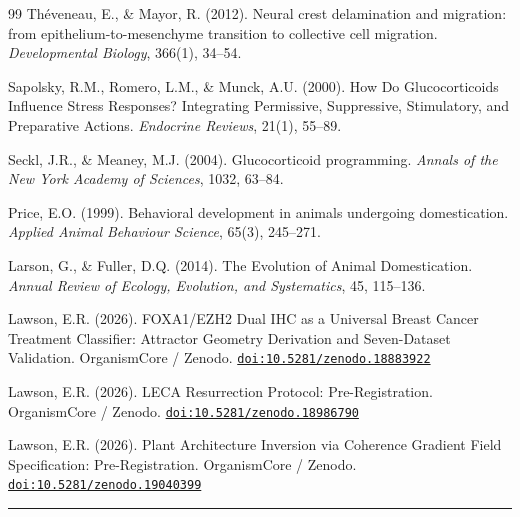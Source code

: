 \documentclass[11pt, a4paper]{article}
\begin{document}
\begin{thebibliography}{99}
Th\'{e}veneau, E., \& Mayor, R. (2012).
Neural crest delamination and migration:
from epithelium-to-mesenchyme transition to collective
cell migration.
\textit{Developmental Biology}, 366(1), 34--54.

Sapolsky, R.M., Romero, L.M., \& Munck, A.U. (2000).
How Do Glucocorticoids Influence Stress Responses?
Integrating Permissive, Suppressive, Stimulatory, and
Preparative Actions.
\textit{Endocrine Reviews}, 21(1), 55--89.

Seckl, J.R., \& Meaney, M.J. (2004).
Glucocorticoid programming.
\textit{Annals of the New York Academy of Sciences},
1032, 63--84.

Price, E.O. (1999).
Behavioral development in animals undergoing
domestication.
\textit{Applied Animal Behaviour Science},
65(3), 245--271.

Larson, G., \& Fuller, D.Q. (2014).
The Evolution of Animal Domestication.
\textit{Annual Review of Ecology, Evolution,
and Systematics}, 45, 115--136.

Lawson, E.R. (2026).
FOXA1/EZH2 Dual IHC as a Universal Breast Cancer
Treatment Classifier: Attractor Geometry Derivation
and Seven-Dataset Validation.
OrganismCore / Zenodo.
\href{https://doi.org/10.5281/zenodo.18883922}
{\texttt{doi:10.5281/zenodo.18883922}}

Lawson, E.R. (2026).
LECA Resurrection Protocol: Pre-Registration.
OrganismCore / Zenodo.
\href{https://doi.org/10.5281/zenodo.18986790}
{\texttt{doi:10.5281/zenodo.18986790}}

Lawson, E.R. (2026).
Plant Architecture Inversion via Coherence Gradient
Field Specification: Pre-Registration.
OrganismCore / Zenodo.
\href{https://doi.org/10.5281/zenodo.19040399}
{\texttt{doi:10.5281/zenodo.19040399}}

\end{thebibliography}

\vspace{1em}
\noindent\textcolor{rulecolor}{\rule{\linewidth}{0.6pt}}
\vspace{0.3em}
\end{document}
